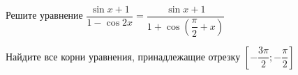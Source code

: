 \begin{ex}
	\begin{condition}
		\begin{enumcols}[label=\asbuk*)]
			\item Решите уравнение \( \dfrac{\sin x +1}{1 - \cos 2x}=\dfrac{\sin x + 1}{1 + \cos{\left(\dfrac{\pi}{2}+x\right)}} \)
			\item Найдите все корни уравнения, принадлежащие отрезку \( \left[-\dfrac{3\pi}{2};-\dfrac{\pi}{2}\right] \)
		\end{enumcols}
	\end{condition}
\end{ex}